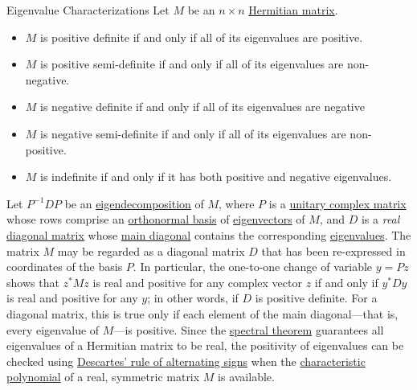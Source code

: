 {{{{{{{{{\begin{theorem}{Eigenvalue Characterizations}
Let \(M\) be an \(n \times n\) \href{Hermitian_matrix}{Hermitian
matrix}.
\begin{itemize}
\item
  \(M\) is positive definite if and only if all of its eigenvalues are
  positive.
\item
  \(M\) is positive semi-definite if and only if all of its eigenvalues
  are non-negative.
\item
  \(M\) is negative definite if and only if all of its eigenvalues are
  negative
\item
  \(M\) is negative semi-definite if and only if all of its eigenvalues
  are non-positive.
\item
  \(M\) is indefinite if and only if it has both positive and negative
  eigenvalues.
\end{itemize}
\end{theorem}

Let \(P^{-1} DP\) be an
\href{eigendecomposition_of_a_matrix}{eigendecomposition} of \(M\),
where \(P\) is a \href{unitary_matrix}{unitary complex matrix} whose
rows comprise an \href{orthonormal_basis}{orthonormal basis} of
\href{eigenvector}{eigenvectors} of \(M\), and \(D\) is a \emph{real}
\href{diagonal_matrix}{diagonal matrix} whose \href{main_diagonal}{main
diagonal} contains the corresponding \href{eigenvalue}{eigenvalues}. The
matrix \(M\) may be regarded as a diagonal matrix \(D\) that has been
re-expressed in coordinates of the basis \(P\). In particular, the
one-to-one change of variable \(y = Pz\) shows that \(z^* Mz\) is real
and positive for any complex vector \(z\) if and only if \(y^* Dy\) is
real and positive for any \(y\); in other words, if \(D\) is positive
definite. For a diagonal matrix, this is true only if each element of
the main diagonal---that is, every eigenvalue of \(M\)---is positive.
Since the \href{spectral_theorem}{spectral theorem} guarantees all
eigenvalues of a Hermitian matrix to be real, the positivity of
eigenvalues can be checked using
\href{Descartes'_rule_of_signs}{Descartes' rule of alternating signs}
when the \href{characteristic_polynomial}{characteristic polynomial} of
a real, symmetric matrix \(M\) is available.

\hypertarget{characterizations}{%
}}}}}}}}}}
